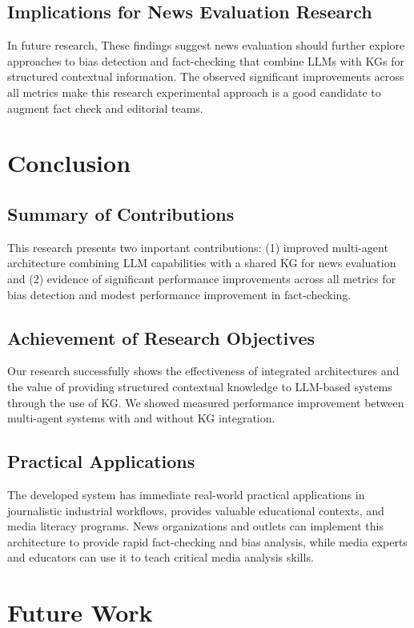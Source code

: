 \documentclass[11pt]{article}
\begin{document}
\subsection{Implications for News Evaluation Research}
In future research, These findings suggest news evaluation should further explore approaches to bias detection and fact-checking that combine LLMs with KGs for structured contextual information. The observed significant improvements across all metrics make this research experimental approach is a good candidate to augment fact check and editorial teams.

\section{Conclusion}
\subsection{ Summary of Contributions}
This research presents two important contributions: (1) improved multi-agent architecture combining LLM capabilities with a shared KG for news evaluation and (2) evidence of significant performance improvements across all metrics for bias detection and modest performance improvement in fact-checking. 

\subsection{Achievement of Research Objectives}
Our research successfully shows the effectiveness of integrated architectures and the value of providing structured contextual knowledge to LLM-based systems through the use of KG. We showed measured performance improvement between multi-agent systems with and without KG integration.

\subsection{Practical Applications}
The developed system has immediate real-world practical applications in journalistic industrial workflows, provides valuable educational contexts, and media literacy programs. News organizations and outlets can implement this architecture to provide rapid fact-checking and bias analysis, while media experts and educators can use it to teach critical media analysis skills.


\section{Future Work}
\end{document}
